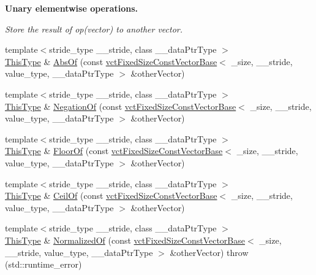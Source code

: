 \begin{Indent}{\bf Unary elementwise operations.}\par
{\em Store the result of op(vector) to another vector. }\begin{DoxyCompactItemize}
\item 
{\footnotesize template$<$stride\-\_\-type \-\_\-\-\_\-stride, class \-\_\-\-\_\-data\-Ptr\-Type $>$ }\\\hyperlink{classvct_fixed_size_const_vector_base_a071063bc4fa43112cc287b2dbef53180}{This\-Type} \& \hyperlink{classvct_fixed_size_vector_base_a1ae580bac81c0dcfc7da8397f1756fd1}{Abs\-Of} (const \hyperlink{classvct_fixed_size_const_vector_base}{vct\-Fixed\-Size\-Const\-Vector\-Base}$<$ \-\_\-size, \-\_\-\-\_\-stride, value\-\_\-type, \-\_\-\-\_\-data\-Ptr\-Type $>$ \&other\-Vector)
\item 
{\footnotesize template$<$stride\-\_\-type \-\_\-\-\_\-stride, class \-\_\-\-\_\-data\-Ptr\-Type $>$ }\\\hyperlink{classvct_fixed_size_const_vector_base_a071063bc4fa43112cc287b2dbef53180}{This\-Type} \& \hyperlink{classvct_fixed_size_vector_base_a4533462c7bb10d5b04a450fc024d076a}{Negation\-Of} (const \hyperlink{classvct_fixed_size_const_vector_base}{vct\-Fixed\-Size\-Const\-Vector\-Base}$<$ \-\_\-size, \-\_\-\-\_\-stride, value\-\_\-type, \-\_\-\-\_\-data\-Ptr\-Type $>$ \&other\-Vector)
\item 
{\footnotesize template$<$stride\-\_\-type \-\_\-\-\_\-stride, class \-\_\-\-\_\-data\-Ptr\-Type $>$ }\\\hyperlink{classvct_fixed_size_const_vector_base_a071063bc4fa43112cc287b2dbef53180}{This\-Type} \& \hyperlink{classvct_fixed_size_vector_base_a13053455b81e4b5c15094fa9b6524176}{Floor\-Of} (const \hyperlink{classvct_fixed_size_const_vector_base}{vct\-Fixed\-Size\-Const\-Vector\-Base}$<$ \-\_\-size, \-\_\-\-\_\-stride, value\-\_\-type, \-\_\-\-\_\-data\-Ptr\-Type $>$ \&other\-Vector)
\item 
{\footnotesize template$<$stride\-\_\-type \-\_\-\-\_\-stride, class \-\_\-\-\_\-data\-Ptr\-Type $>$ }\\\hyperlink{classvct_fixed_size_const_vector_base_a071063bc4fa43112cc287b2dbef53180}{This\-Type} \& \hyperlink{classvct_fixed_size_vector_base_ac43670d4e45b7e9e6f67ea98fe0cd89b}{Ceil\-Of} (const \hyperlink{classvct_fixed_size_const_vector_base}{vct\-Fixed\-Size\-Const\-Vector\-Base}$<$ \-\_\-size, \-\_\-\-\_\-stride, value\-\_\-type, \-\_\-\-\_\-data\-Ptr\-Type $>$ \&other\-Vector)
\item 
{\footnotesize template$<$stride\-\_\-type \-\_\-\-\_\-stride, class \-\_\-\-\_\-data\-Ptr\-Type $>$ }\\\hyperlink{classvct_fixed_size_const_vector_base_a071063bc4fa43112cc287b2dbef53180}{This\-Type} \& \hyperlink{classvct_fixed_size_vector_base_a80358993cd1e1c4207346aa43a6ce090}{Normalized\-Of} (const \hyperlink{classvct_fixed_size_const_vector_base}{vct\-Fixed\-Size\-Const\-Vector\-Base}$<$ \-\_\-size, \-\_\-\-\_\-stride, value\-\_\-type, \-\_\-\-\_\-data\-Ptr\-Type $>$ \&other\-Vector)  throw (std\-::runtime\-\_\-error)
\end{DoxyCompactItemize}
\end{Indent}

